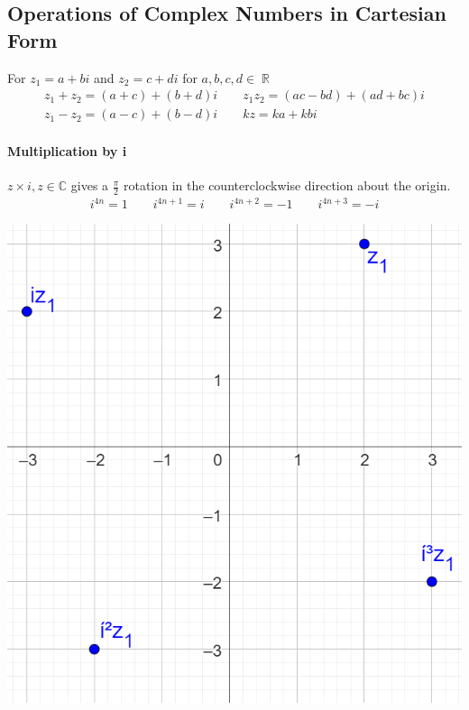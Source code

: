 \documentclass[a4paper,twoside,10pt]{article}
\DeclareMathOperator\R{\mathbb{R}}
\begin{document}
		\subsection{Operations of Complex Numbers in Cartesian Form}
			For $z_1=a+bi$ and $z_2=c+di$ for $a,b,c,d\in\R$
			\begin{align*}
				z_1+z_2=(a+c)+(b+d)i \qquad z_1z_2=(ac-bd)+(ad+bc)i \\
				z_1-z_2=(a-c)+(b-d)i \qquad kz=ka+kbi
			\end{align*}
			\begin{minipage}{0.5\textwidth}
				\paragraph{Multiplication by i} $z\times i,z\in\mathbb{C}$ gives a $\frac{\pi}{2}$ rotation in the counterclockwise direction about the origin.
				\begin{align*}
					i^{4n}=1 \qquad i^{4n+1}=i \qquad i^{4n+2}=-1 \qquad i^{4n+3}=-i
				\end{align*}
			\end{minipage}
			\hfill
			\begin{minipage}{0.4\textwidth}
				\includegraphics[width=\linewidth]{argandrotate.png}
			\end{minipage}
\end{document}
